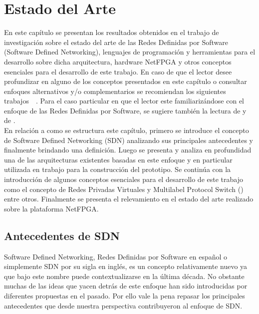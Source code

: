 
\chapter{Estado del Arte}  %

\ifpdf
    \graphicspath{{Chapter2/Figs/Raster/}{Chapter2/Figs/PDF/}{Chapter2/Figs/}}
\else
    \graphicspath{{Chapter2/Figs/Vector/}{Chapter2/Figs/}}
\fi

En este capítulo se presentan los resultados obtenidos en el trabajo de investigación sobre el estado
del arte de las Redes Definidas por Software (Software Defined Networking), lenguajes
de programación y herramientas para el desarrollo sobre dicha arquitectura, hardware NetFPGA y otros conceptos esenciales para el desarrollo de este trabajo. En caso de que el lector desee profundizar en alguno de los conceptos presentados en este cap\'itulo o consultar enfoques alternativos
y/o complementarios se recomiendan los siguientes trabajos~\citep{StateOfArt1}~\citep{StateOfArt2}. Para el caso particular en que el lector este familiarizándose con el enfoque de las Redes Definidas por Software, se sugiere también la lectura de \citep{SDNReadingList} y de \citep{SDNBook1}.\\

En relación a como se estructura este cap\'itulo, primero se introduce el concepto de Software Defined Networking (SDN) analizando sus principales antecedentes y finalmente brindando una definición. Luego se presenta y analiza en profundidad una de las arquitecturas existentes basadas en este enfoque y en particular utilizada en trabajo para la construcción del prototipo. Se contin\'ua con la introducción de algunos conceptos esenciales para el desarrollo de este trabajo como el concepto de Redes Privadas Virtuales y Multilabel Protocol Switch () entre otros. Finalmente se presenta el relevamiento en el estado del arte realizado sobre la plataforma NetFPGA.  

\section{Antecedentes de SDN} %
Software Defined Networking, Redes Definidas por Software en español o simplemente SDN por su sigla en ingl\'es, es un concepto relativamente nuevo ya que bajo este nombre puede contextualizarse en la \'ultima década. No obstante muchas de las ideas que yacen detrás de este enfoque han sido introducidas por diferentes propuestas en el pasado. Por ello vale la pena repasar los principales antecedentes que desde nuestra perspectiva contribuyeron al enfoque de SDN. 

